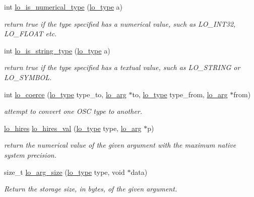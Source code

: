 \begin{CompactItemize}
int \hyperlink{group__liblolowlevel_gce222e42c35d0256f115e00b84e8f853}{lo\_\-is\_\-numerical\_\-type} (\hyperlink{group__liblo_g11838c576b0197c255ce805fd7434736}{lo\_\-type} a)
\begin{CompactList}\small\item\em return true if the type specified has a numerical value, such as LO\_\-INT32, LO\_\-FLOAT etc. \item\end{CompactList}\item 
int \hyperlink{group__liblolowlevel_geb9f59d9f7bf8d50f21809e44889eee7}{lo\_\-is\_\-string\_\-type} (\hyperlink{group__liblo_g11838c576b0197c255ce805fd7434736}{lo\_\-type} a)
\begin{CompactList}\small\item\em return true if the type specified has a textual value, such as LO\_\-STRING or LO\_\-SYMBOL. \item\end{CompactList}\item 
int \hyperlink{group__liblolowlevel_gf85d7a54ab80e1b2a3d17c4cfef38402}{lo\_\-coerce} (\hyperlink{group__liblo_g11838c576b0197c255ce805fd7434736}{lo\_\-type} type\_\-to, \hyperlink{unionlo__arg}{lo\_\-arg} $\ast$to, \hyperlink{group__liblo_g11838c576b0197c255ce805fd7434736}{lo\_\-type} type\_\-from, \hyperlink{unionlo__arg}{lo\_\-arg} $\ast$from)
\begin{CompactList}\small\item\em attempt to convert one OSC type to another. \item\end{CompactList}\item 
\hyperlink{group__liblolowlevel_g0062385786b0375d4b6954ba1fb8d52b}{lo\_\-hires} \hyperlink{group__liblolowlevel_gfb7036664581480c9f2e898e57704c1b}{lo\_\-hires\_\-val} (\hyperlink{group__liblo_g11838c576b0197c255ce805fd7434736}{lo\_\-type} type, \hyperlink{unionlo__arg}{lo\_\-arg} $\ast$p)
\begin{CompactList}\small\item\em return the numerical value of the given argument with the maximum native system precision. \item\end{CompactList}\item 
size\_\-t \hyperlink{group__liblolowlevel_gf793bbd32346a91d7d680d91ae68d1bd}{lo\_\-arg\_\-size} (\hyperlink{group__liblo_g11838c576b0197c255ce805fd7434736}{lo\_\-type} type, void $\ast$data)
\begin{CompactList}\small\item\em Return the storage size, in bytes, of the given argument. \item\end{CompactList}\item 

\end{CompactItemize}
